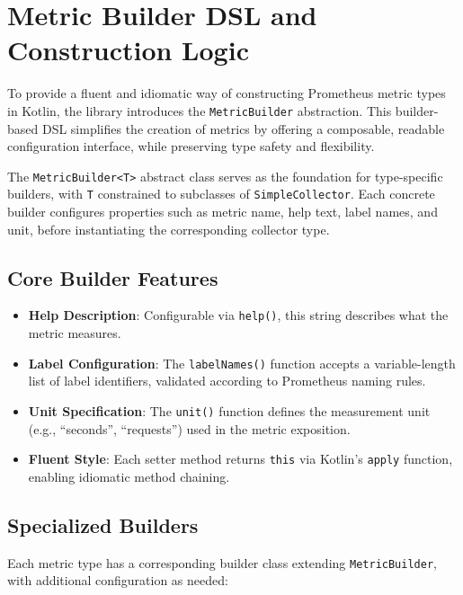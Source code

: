 \section{Metric Builder DSL and Construction Logic}

To provide a fluent and idiomatic way of constructing Prometheus metric types in Kotlin, the library introduces the \texttt{MetricBuilder} abstraction. This builder-based DSL simplifies the creation of metrics by offering a composable, readable configuration interface, while preserving type safety and flexibility.

The \texttt{MetricBuilder<T>} abstract class serves as the foundation for type-specific builders, with \texttt{T} constrained to subclasses of \texttt{SimpleCollector}. Each concrete builder configures properties such as metric name, help text, label names, and unit, before instantiating the corresponding collector type.

\subsection*{Core Builder Features}
\begin{itemize}
    \item \textbf{Help Description}: Configurable via \texttt{help()}, this string describes what the metric measures.
    
    \item \textbf{Label Configuration}: The \texttt{labelNames()} function accepts a variable-length list of label identifiers, validated according to Prometheus naming rules.
    
    \item \textbf{Unit Specification}: The \texttt{unit()} function defines the measurement unit (e.g., ``seconds'', ``requests'') used in the metric exposition.
    
    \item \textbf{Fluent Style}: Each setter method returns \texttt{this} via Kotlin’s \texttt{apply} function, enabling idiomatic method chaining.
\end{itemize}

\subsection*{Specialized Builders}
Each metric type has a corresponding builder class extending \texttt{MetricBuilder}, with additional configuration as needed:

